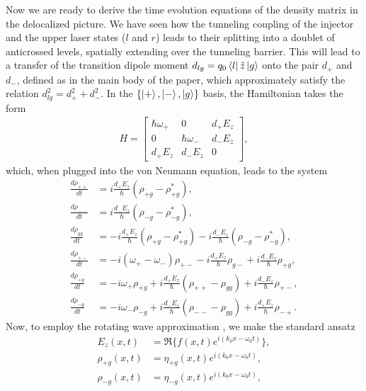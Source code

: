 \documentclass[onecolumn,secnumarabic,amssymb, nobibnotes, aip, prd]{revtex4-1}
\begin{document}
\begin{appendices}
Now we are ready to derive the time evolution equations of the density matrix in the delocalized picture. We have seen how the tunneling coupling of the injector and the upper laser states ($l$ and $r$) leads to their splitting into a doublet of anticrossed levels, spatially extending over the tunneling barrier. This will lead to a transfer of the transition dipole moment $d_{lg}=q_0\bra{l}\hat{z}\ket{g}$ onto the pair $d_{+}$ and $d_{-}$, defined as in the main body of the paper, which approximately satisfy the relation $d_{lg}^2=d_{+}^2+d_{-}^2$. In the $\{\ket{+},\ket{-},\ket{g}\}$ basis, the Hamiltonian takes the form
\begin{align}
H = \begin{bmatrix}
\hbar\omega_+ & 0 & d_+E_z \\
0 & \hbar\omega_- & d_-E_z \\
d_+E_z & d_-E_z & 0
\end{bmatrix},
\end{align}
which, when plugged into the von Neumann equation, leads to the system
\begin{subequations}
\label{eq:vonNeu_nonapprox}
\begin{align}
\frac{d \rho_{++}}{dt} &= i\frac{d_+E_z}{\hbar}(\rho_{+g}-\rho_{+g}^*), \\
\frac{d \rho_{--}}{dt} &= i\frac{d_-E_z}{\hbar}(\rho_{-g}-\rho_{-g}^*), \\
\frac{d \rho_{gg}}{dt} &= -i\frac{d_+E_z}{\hbar}(\rho_{+g}-\rho_{+g}^*)-i\frac{d_-E_z}{\hbar}(\rho_{-g}-\rho_{-g}^*), \\
\frac{d \rho_{+-}}{dt} &= -i(\omega_+-\omega_-)\rho_{+-}-i\frac{d_{+}E_z}{\hbar}\rho_{g-}+i\frac{d_{-}E_z}{\hbar}\rho_{+g},\\
\frac{d \rho_{+g}}{dt} &= -i\omega_+\rho_{+g}+i\frac{d_{+}E_z}{\hbar}(\rho_{++}-\rho_{gg})+i\frac{d_{-}E_z}{\hbar}\rho_{+-}, \\
\frac{d \rho_{-g}}{dt} &= -i\omega_-\rho_{-g}+i\frac{d_{-}E_z}{\hbar}(\rho_{--}-\rho_{gg})+i\frac{d_{+}E_z}{\hbar}\rho_{-+}. 
\end{align}
\end{subequations}
Now, to employ the rotating wave approximation \cite{weiner2011ultrafast}, we make the standard ansatz 
\begin{subequations}
\begin{align}
E_z(x,t) &= \Re\{f(x,t)e^{i(k_0x-\omega_0t)}\}, \\
\rho_{+g}(x,t) &= \eta_{+g}(x,t)e^{i(k_0x-\omega_0t)}, \\
\rho_{-g}(x,t) &= \eta_{-g}(x,t)e^{i(k_0x-\omega_0t)},

\end{align}
\end{subequations}
\end{appendices}
\end{document}
